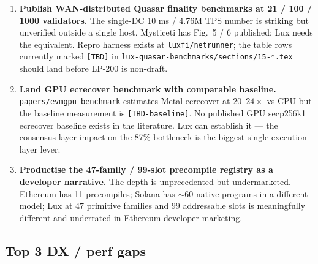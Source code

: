 \documentclass[11pt,a4paper]{article}
\begin{document}
\begin{enumerate}[leftmargin=1.4em,topsep=0.2em,itemsep=0.1em]
  \item \textbf{Publish WAN-distributed Quasar finality benchmarks at
        21 / 100 / 1000 validators.} The single-DC 10 ms / 4.76M TPS
        number is striking but unverified outside a single host.
        Mysticeti has Fig.~5 / 6 published; Lux needs the equivalent.
        Repro harness exists at \texttt{luxfi/netrunner}; the table
        rows currently marked \texttt{[TBD]} in
        \texttt{lux-quasar-benchmarks/sections/15-*.tex} should land
        before LP-200 is non-draft.
  \item \textbf{Land GPU ecrecover benchmark with comparable baseline.}
        \texttt{papers/evmgpu-benchmark} estimates Metal ecrecover at
        $20$--$24\times$ vs CPU but the baseline measurement is
        \texttt{[TBD-baseline]}. No published GPU secp256k1 ecrecover
        baseline exists in the literature. Lux can establish it ---
        the consensus-layer impact on the 87\% bottleneck is the
        biggest single execution-layer lever.
  \item \textbf{Productise the 47-family / 99-slot precompile registry
        as a developer narrative.} The depth is unprecedented but
        undermarketed. Ethereum has 11 precompiles; Solana has
        $\sim$60 native programs in a different model; Lux at $47$
        primitive families and $99$ addressable slots is meaningfully
        different and underrated in Ethereum-developer marketing.
\end{enumerate}

\subsection{Top 3 DX / perf gaps}
\end{document}
